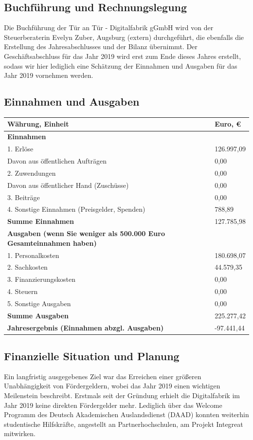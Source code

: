 \documentclass[12pt, a4paper]{article} %
\begin{document}
\hypertarget{buchfuxfchrung-und-rechnungslegung}{%
\subsection{Buchführung und
Rechnungslegung}\label{buchfuxfchrung-und-rechnungslegung}}

Die Buchführung der Tür an Tür - Digitalfabrik gGmbH wird von der
Steuerberaterin Evelyn Zuber, Augsburg (extern) durchgeführt, die
ebenfalls die Erstellung des Jahresabschlusses und der Bilanz übernimmt.
Der Geschäftsabschluss für das Jahr 2019 wird erst zum Ende dieses
Jahres erstellt, sodass wir hier lediglich eine Schätzung der Einnahmen
und Ausgaben für das Jahr 2019 vornehmen werden.

\hypertarget{einnahmen-und-ausgaben}{%
\subsection{Einnahmen und Ausgaben}\label{einnahmen-und-ausgaben}}

\begin{tabularx}{\textwidth}{Xp{2cm}}
  \toprule
  \textbf{Währung, Einheit} & \textbf{Euro, \euro}\tabularnewline
  \midrule
  \textbf{Einnahmen} &\tabularnewline
  1. Erlöse & 126.997,09\tabularnewline
  Davon aus öffentlichen Aufträgen & 0,00\tabularnewline
  2. Zuwendungen & 0,00\tabularnewline
  Davon aus öffentlicher Hand (Zuschüsse) & 0,00\tabularnewline
  3. Beiträge & 0,00\tabularnewline
  4. Sonstige Einnahmen (Preisgelder, Spenden) & 788,89\tabularnewline
  \textbf{Summe Einnahmen} & 127.785,98\tabularnewline
  \midrule
  \textbf{Ausgaben (wenn Sie weniger als 500.000 Euro Gesamteinnahmen
  haben)} &\tabularnewline
  1. Personalkosten & 180.698,07\tabularnewline
  2. Sachkosten & 44.579,35\tabularnewline
  3. Finanzierungskosten & 0,00\tabularnewline
  4. Steuern & 0,00\tabularnewline
  5. Sonstige Ausgaben & 0,00\tabularnewline
  \textbf{Summe Ausgaben} & 225.277,42\tabularnewline
  \midrule
  \textbf{Jahresergebnis (Einnahmen abzgl. Ausgaben)} &
  -97.441,44\tabularnewline
  \bottomrule
  \end{tabularx}

\hypertarget{finanzielle-situation-und-planung}{%
\subsection{Finanzielle Situation und
Planung}\label{finanzielle-situation-und-planung}}

Ein langfristig ausgegebenes Ziel war das Erreichen einer größeren
Unabhängigkeit von Fördergeldern, wobei das Jahr 2019 einen wichtigen
Meilenstein beschreibt. Erstmals seit der Gründung erhielt die
Digitalfabrik im Jahr 2019 keine direkten Fördergelder mehr. Lediglich
über das Welcome Programm des Deutsch Akademischen Auslandsdienst (DAAD)
konnten weiterhin studentische Hilfskräfte, angestellt an
Partnerhochschulen, am Projekt Integreat mitwirken.
\end{document}
